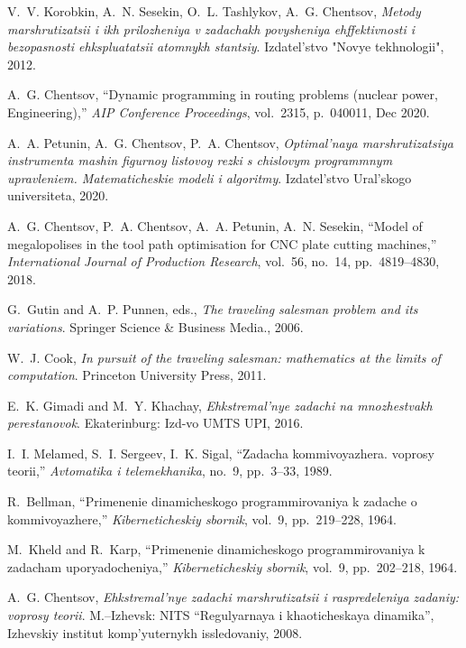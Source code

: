 \begin{thebibliography}{10}

V.~V. Korobkin, A.~N. Sesekin, O.~L. Tashlykov, A.~G. Chentsov, {\em Metody
  marshrutizatsii i ikh prilozheniya v zadachakh povysheniya ehffektivnosti i
  bezopasnosti ehkspluatatsii atomnykh stantsiy}.
\newblock Izdatel'stvo "Novye tekhnologii", 2012.

A.~G. Chentsov, ``{Dynamic programming in routing problems (nuclear power,
  Engineering)},'' {\em AIP Conference Proceedings}, vol.~2315, p.~040011, Dec
  2020.

A.~A. Petunin, A.~G. Chentsov, P.~A. Chentsov, {\em Optimal'naya
  marshrutizatsiya instrumenta mashin figurnoy listovoy rezki s chislovym
  programmnym upravleniem. Matematicheskie modeli i algoritmy}.
\newblock Izdatel'stvo Ural'skogo universiteta, 2020.

A.~G. Chentsov, P.~A. Chentsov, A.~A. Petunin, A.~N. Sesekin, ``Model of
  megalopolises in the tool path optimisation for {CNC} plate cutting
  machines,'' {\em International Journal of Production Research}, vol.~56,
  no.~14, pp.~4819--4830, 2018.

G.~Gutin and A.~P. Punnen, eds., {\em The traveling salesman problem and its
  variations}.
\newblock Springer Science \& Business Media., 2006.

W.~J. Cook, {\em In pursuit of the traveling salesman: mathematics at the
  limits of computation}.
\newblock Princeton University Press, 2011.

E.~K. Gimadi and M.~Y. Khachay, {\em Ehkstremal'nye zadachi na mnozhestvakh
  perestanovok}.
\newblock Ekaterinburg: Izd-vo UMTS UPI, 2016.

I.~I. Melamed, S.~I. Sergeev, I.~K. Sigal, ``Zadacha kommivoyazhera.
  voprosy teorii,'' {\em Avtomatika i telemekhanika}, no.~9, pp.~3--33, 1989.

R.~Bellman, ``Primenenie dinamicheskogo programmirovaniya k zadache o
  kommivoyazhere,'' {\em Kiberneticheskiy sbornik}, vol.~9, pp.~219--228, 1964.

M.~Kheld and R.~Karp, ``Primenenie dinamicheskogo programmirovaniya k zadacham
  uporyadocheniya,'' {\em Kiberneticheskiy sbornik}, vol.~9, pp.~202--218,
  1964.

A.~G. Chentsov, {\em Ehkstremal'nye zadachi marshrutizatsii i raspredeleniya
  zadaniy: voprosy teorii}.
\newblock M.--Izhevsk: NITS ``Regulyarnaya i khaoticheskaya dinamika'',
  Izhevskiy institut komp'yuternykh issledovaniy, 2008.


\end{thebibliography}
